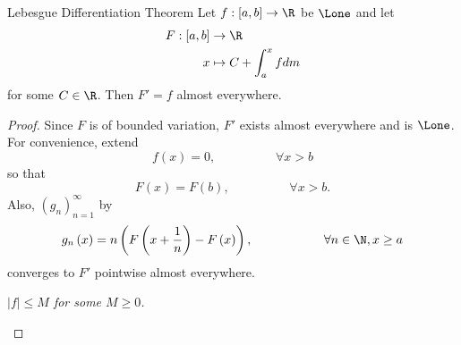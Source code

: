 \documentclass[pmath451]{subfiles}
\begin{document}
    \rruleline
    
    \begin{theorem}{Lebesgue Differentiation Theorem}
        Let $f:\left[ a,b \right]\to\R$ be $\Lone$ and let
        \begin{equation*}
            \begin{aligned}
                F:\left[ a,b \right]&\to\R \\
                x&\mapsto C + \int^{x}_{a}fdm
            \end{aligned} 
        \end{equation*}
        for some $C\in\R$. Then $F'=f$ almost everywhere.
    \end{theorem}
    
    \begin{proof}
        Since $F$ is of bounded variation, $F'$ exists almost everywhere and is $\Lone$. For convenience, extend
        \begin{equation*}
            f\left( x \right) = 0 , \hspace{2cm}\forall x>b
        \end{equation*}
        so that
        \begin{equation*}
            F\left( x \right) = F\left( b \right) , \hspace{2cm}\forall x>b.
        \end{equation*}
        Also, $\left( g_{n} \right)^{\infty}_{n=1}$ by
        \begin{equation*}
            g_n\left( x \right) = n\left( F\left( x+\frac{1}{n} \right)-F\left( x \right) \right), \hspace{2cm}\forall n\in\N, x\geq a
        \end{equation*}
        converges to $F'$ pointwise almost everywhere.

        \begin{case}
            \textit{$\left| f \right|\leq M$ for some $M\geq 0$.}


\end{case}
\end{proof}
\end{document}
